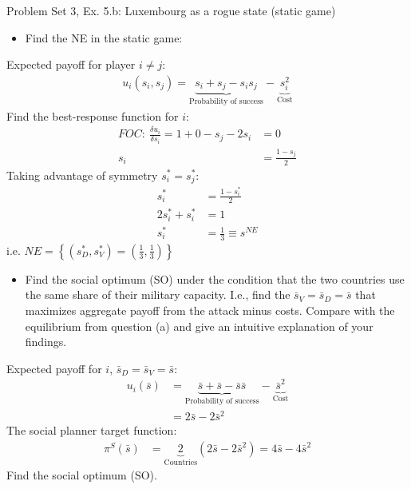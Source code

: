 \begin{frame}{Problem Set 3, Ex. 5.b: Luxembourg as a rogue state (static game)}
  \begin{multicols}{2}
    \begin{itemize}
      \item[(a)] Find the NE in the static game:
    \end{itemize}
    Expected payoff for player $i\neq j$:
    \begin{align*}
      u_i(s_i,s_j)=\underbrace{s_i+s_j-s_is_j}_\text{Probability of success}-\underbrace{s_i^2}_\text{Cost}
    \end{align*}
    Find the best-response function for $i$:
    \begin{align*}
      FOC:\ \frac{\delta u_i}{\delta s_i}=1+0-s_j-2s_i&=0\\
       s_i&=\frac{1-s_j}{2}
    \end{align*}
    Taking advantage of symmetry $s_i^{*}=s_j^{*}$:
    \begin{align*}
       s_i^{*}&=\frac{1-s_i^{*}}{2}\\
      2s_i^{*}+s_i^{*}&=1\\
       s_i^{*}&=\frac{1}{3}\equiv s^{NE}
    \end{align*}
    i.e. $NE=\left\{(s_D^{*},s_V^{*})=(\frac{1}{3},\frac{1}{3})\right\}$
  \vfill\null\columnbreak
    \begin{itemize}
      \item[(b)] Find the social optimum (SO) under the condition that the two countries use the same share of their military capacity. I.e., find the $\bar{s}_V=\bar{s}_D=\bar{s}$ that maximizes aggregate payoff from the attack minus costs. Compare with the equilibrium from question (a) and give an intuitive explanation of your findings.
    \end{itemize}
    Expected payoff for $i$, $\bar{s}_D=\bar{s}_V=\bar{s}$:
    \vspace{-6pt}
    \begin{align*}
      u_i(\bar{s})&=\underbrace{\bar{s}+\bar{s}-\bar{s}\bar{s}}_\text{Probability of success}-\underbrace{\bar{s}^2}_\text{Cost}\\
                  &=2\bar{s}-2\bar{s}^2
    \end{align*}
    \vspace{-6pt}
    The social planner target function:
    \begin{align*}
      \pi^S(\bar{s})&=\underbrace{2}_\text{Countries}(2\bar{s}-2\bar{s}^2)=4\bar{s}-4\bar{s}^2
    \end{align*}
    \vspace{-6pt}
    Find the social optimum (SO).
  \vfill\null
  \end{multicols}
\end{frame}

